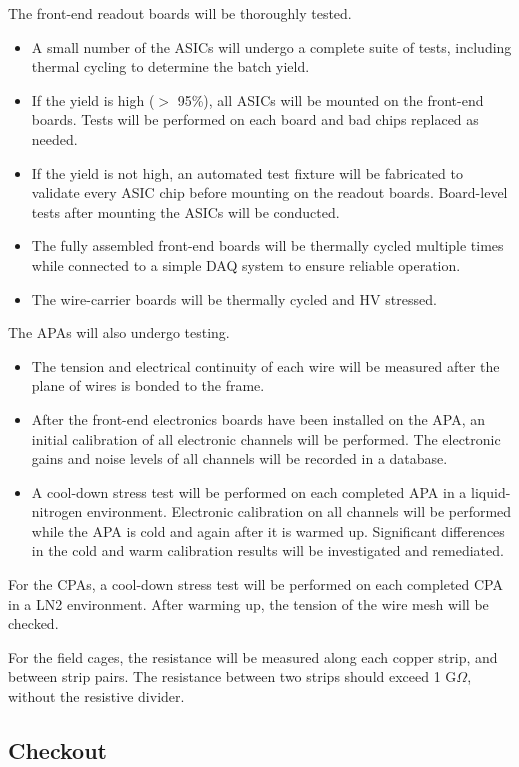 The front-end readout boards will be thoroughly tested.
\begin{itemize}
\item A small number of the ASICs will undergo a complete suite 
of tests, including thermal cycling to determine the batch yield.
\item If the yield is high ($>$ 95\%), all ASICs will be mounted 
on the front-end boards.  Tests will be performed on each board  
and bad chips replaced as needed.
\item If the yield is not high, an automated test fixture will be 
fabricated to validate every ASIC chip before mounting on the 
readout boards.  Board-level tests after mounting the
ASICs will be conducted.
\item The fully assembled front-end boards will be thermally cycled multiple times while connected to a simple DAQ system to ensure reliable operation.
\item The wire-carrier boards will be thermally cycled and HV stressed.
\end{itemize}

The APAs will also undergo testing.
\begin{itemize}
\item The tension and electrical continuity of each wire will be 
measured after the plane of wires is bonded to the frame.
\item After the front-end electronics boards have been installed on 
the APA, an initial calibration of all electronic channels will be 
performed.  The electronic gains and noise levels of all channels will be 
recorded in a database.
\item A cool-down stress test will be performed on each completed 
APA in a liquid-nitrogen environment.  Electronic calibration on 
all channels will be performed while the APA is cold and again
after it is warmed up.  Significant differences in the cold and warm calibration 
results will be investigated and remediated.  
\end{itemize}

For the CPAs, a cool-down stress test will be performed on each completed 
CPA in a LN2 environment.  After warming up, 
 the tension of the wire mesh will be checked.


For the field cages,  the resistance will be measured along each copper strip,  
and between strip pairs.  The resistance between two 
strips should exceed 1 G$\Omega$, without the resistive divider. 

\subsection{Checkout } 
\label{sec:ce-checkout-checkout}


